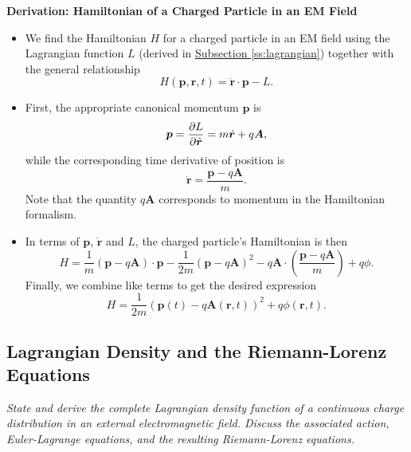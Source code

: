 \documentclass[11pt, a4paper]{article}
\renewcommand{\vec}[1]{\bm{#1}} %
\renewcommand{\r}{\vec{r}}
\newcommand{\A}{\vec{A}} %
\begin{document}
\textbf{Derivation: Hamiltonian of a Charged Particle in an EM Field}
\begin{itemize}
    \item We find the Hamiltonian $ H $ for a charged particle in an EM field using the Lagrangian function $ L $ (derived in \hyperref[ss:lagrangian]{\underline{Subsection \ref{ss:lagrangian}}}) together with the general relationship
    \begin{equation*}
        H( \vec{p}, \vec{r}, t) = \dot{\vec{r}} \cdot \vec{p} - L.
    \end{equation*}
    
    \item First, the appropriate canonical momentum $ \vec{p} $ is
    \begin{equation*}
        \vec{p} = \pdv{L}{ \dot{\vec{r}}} = m \dot{\vec{r}} + q \A,
    \end{equation*}
    while the corresponding time derivative of position is
    \begin{equation*}
        \dot{\vec{r}} = \frac{\vec{p} - q\A}{m}.
    \end{equation*}
    Note that the quantity $ q \A $ corresponds to momentum in the Hamiltonian formalism. 

    \item In terms of $ \vec{p} $, $ \dot{\vec{r}} $ and $ L $, the charged particle's Hamiltonian is then
    \begin{equation*}
        H = \frac{1}{m} ( \vec{p} - q\A) \cdot \vec{p} - \frac{1}{2m} ( \vec{p} - q\A)^{2} - q\A \cdot \left( \frac{ \vec{p} - q \A}{m} \right) + q \phi.
    \end{equation*}
    Finally, we combine like terms to get the desired expression
    \begin{equation*}
        H = \frac{1}{2m}( \vec{p}(t) - q\A (\r, t))^{2} + q \phi(\r, t).
    \end{equation*}
    
\end{itemize}
    

\subsection{Lagrangian Density and the Riemann-Lorenz Equations} \label{ss:lagrange-density}
\textit{State and derive the complete Lagrangian density function of a continuous charge distribution in an external electromagnetic field. Discuss the associated action, Euler-Lagrange equations, and the resulting Riemann-Lorenz equations.}
\end{document}
